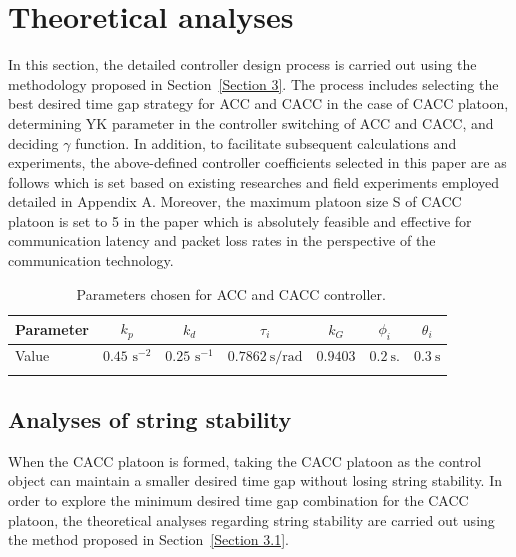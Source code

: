 \documentclass[journal]{IEEEtran}
\begin{document}
\section{Theoretical analyses}
\label{Section 4}
In this section, the detailed controller design process is carried out using the methodology proposed in Section~\ref{Section 3}. The process includes selecting the best desired time gap strategy for ACC and CACC in the case of CACC platoon, determining YK parameter in the controller switching of ACC and CACC, and deciding $\gamma$ function. In addition, to facilitate subsequent calculations and experiments, the above-defined controller coefficients selected in this paper are as follows which is set based on existing researches \citep{milanes2014modeling,milanes2013cooperative,navas2016using} and field experiments employed detailed in Appendix A. Moreover, the maximum platoon size S of CACC platoon is set to 5 in the paper which is absolutely feasible and effective for communication latency and packet loss rates in the perspective of the communication technology.
\begin{table}
  \centering

  \setlength{\abovecaptionskip}{0pt}
  \setlength{\belowcaptionskip}{10pt}%
  \caption{~Parameters chosen for ACC and CACC controller.}
  \resizebox{.95\columnwidth}{!}
  {\begin{tabular}{lcccccc} \toprule
      Parameter & $k_{p}$ & $k_{d}$ & $\tau_{i}$ & $k_{G}$ & $\phi_{i}$ & $\theta_{i}$ \\ \midrule Value & $0.45$ $ \mathrm{s}^{-2}$ & $0.25 $ $ \mathrm{s}^{-1}$ & $0.7862 \mathrm{~s} / \mathrm{rad}$ & $0.9403$ & $0.2 \mathrm{~s}.$ & $0.3 \mathrm{~s}$ \\ \bottomrule
      \label{table1}
    \end{tabular}}

\end{table}

\subsection{Analyses of string stability}
\label{Section 4.1}

When the CACC platoon is formed, taking the CACC platoon as the control object can maintain a smaller desired time gap without losing string stability. In order to explore the minimum desired time gap combination for the CACC platoon, the theoretical analyses regarding string stability are carried out using the method proposed in Section~\ref{Section 3.1}.
\end{document}
